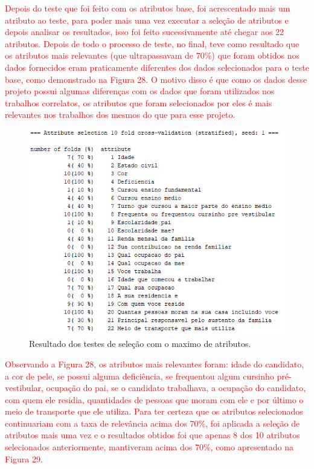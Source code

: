 \par
\textcolor{red}{Depois do teste que foi feito com os atributos base, foi acrescentado mais um atributo ao teste, para poder mais uma vez executar a seleção de atributos e depois analisar os resultados, isso foi feito sucessivamente até chegar aos 22 atributos. Depois de todo o processo de teste, no final, teve como resultado que os atributos mais relevantes (que ultrapassavam de 70\%) que foram obtidos nos dados fornecidos eram praticamente diferentes dos dados selecionados para o teste base, como demonstrado na Figura 28. O motivo disso é que  como os dados desse projeto possui algumas diferenças com os dados que foram utilizados nos trabalhos correlatos, os atributos que foram selecionados por eles é mais relevantes nos trabalhos dos mesmos do que para esse projeto.}

\par
\begin{figure}[!htp]
	\begin{center}
    \caption{\label{fig:waveform_fig} Resultado dos testes de seleção com o maximo de atributos.}
	\includegraphics[scale=0.90]{Figuras/22_atributos.png}
	\end{center}
\end{figure}

\par
\textcolor{red}{}

\par
\textcolor{red}{}

\par
\textcolor{red}{Observando a Figura 28,  os atributos mais relevantes foram: idade do candidato, a cor de pele, se possui alguma deficiência, se frequentou algum cursinho pré-vestibular, ocupação do pai, se o candidato trabalhava, a ocupação do candidato, com quem ele residia, quantidades de pessoas que moram com ele e por último o meio de transporte que ele utiliza. Para ter certeza que os atributos selecionados continuariam com a taxa de relevância acima dos 70\%, foi aplicada a seleção de atributos mais uma vez e o resultados obtidos foi que apenas 8 dos 10 atributos selecionados anteriormente, mantiveram acima dos 70\%, como apresentado na Figura 29.}

